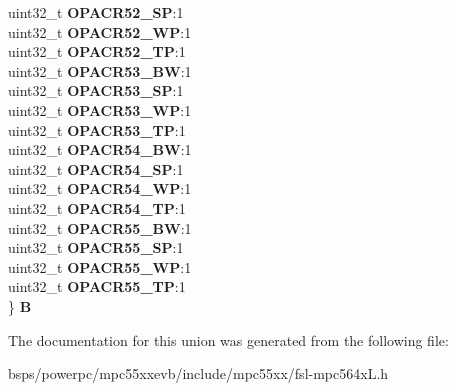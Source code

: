 \begin{DoxyCompactItemize}
\begin{tabbing}
\>uint32\_t {\bfseries OPACR52\_SP}:1\\
\>uint32\_t {\bfseries OPACR52\_WP}:1\\
\>uint32\_t {\bfseries OPACR52\_TP}:1\\
\>uint32\_t {\bfseries OPACR53\_BW}:1\\
\>uint32\_t {\bfseries OPACR53\_SP}:1\\
\>uint32\_t {\bfseries OPACR53\_WP}:1\\
\>uint32\_t {\bfseries OPACR53\_TP}:1\\
\>uint32\_t {\bfseries OPACR54\_BW}:1\\
\>uint32\_t {\bfseries OPACR54\_SP}:1\\
\>uint32\_t {\bfseries OPACR54\_WP}:1\\
\>uint32\_t {\bfseries OPACR54\_TP}:1\\
\>uint32\_t {\bfseries OPACR55\_BW}:1\\
\>uint32\_t {\bfseries OPACR55\_SP}:1\\
\>uint32\_t {\bfseries OPACR55\_WP}:1\\
\>uint32\_t {\bfseries OPACR55\_TP}:1\\
\} {\bfseries B}\\

\end{tabbing}\end{DoxyCompactItemize}


The documentation for this union was generated from the following file\+:\begin{DoxyCompactItemize}
\item 
bsps/powerpc/mpc55xxevb/include/mpc55xx/fsl-\/mpc564x\+L.\+h\end{DoxyCompactItemize}
